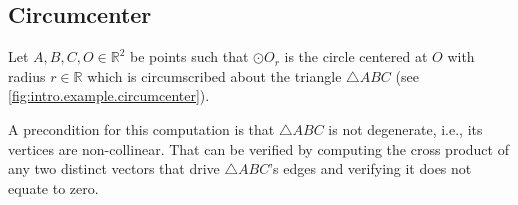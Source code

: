 \begin{comment}
We can determine if two lines are parallel by determining the angle $\theta$
between them, and verifying it is equal to $0$.
%
\begin{equation}\label{eq:angle.vectors.2}
  \theta = \arccos \frac{\vec{u} \cdot \vec{v}}%
                        {||\vec{u}|| \cdot ||\vec{v}||},~%
  \theta \in \mathbb{R}.
\end{equation}
%
Having $\vec{v} = \lambda \vec{u}, \lambda \in \mathbb{R}$, and knowing
%
\begin{equation}\label{eq:dot.vector.2.same}
  \vec{u} \cdot \vec{u} = ||\vec{u}||^2,
\end{equation}
%
then \eqref{eq:angle.vectors.2} becomes
%
\[
  \begin{split}
    \theta & = \arccos \frac{\vec{u} \cdot \lambda\vec{u}}%
                            {||\vec{u}|| \cdot ||\lambda\vec{u}||}\\%
           & = \arccos \frac{\lambda\vec{u} \cdot \vec{u}}%
                            {\lambda||\vec{u}||^2}\\%
           & = 0.
  \end{split}
\]
%
This means that we can compute a directional vector for $CS$ from the line $AB$,
where $\vec{u} = B - A$.  Finally, we can obtain the equation for the parallel
line $CS$
\end{comment}

\subsection{Circumcenter}%
\label{sec:intro.examples.circumcenter}

Let $A, B, C, O \in \mathbb{R}^2$ be points such that $\odot O_r$ is the circle
centered at $O$ with radius $r \in \mathbb{R}$ which is circumscribed about the
triangle $\triangle ABC$ (see \cref{fig:intro.example.circumcenter}).

A precondition for this computation is that $\triangle ABC$ is not degenerate,
i.e., its vertices are non-collinear.  That can be verified by computing the
cross product of any two distinct vectors that drive $\triangle ABC$'s edges and
verifying it does not equate to zero.

